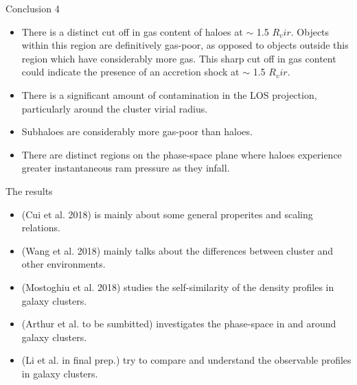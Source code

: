 \documentclass[aspectratio=43]{beamer}
\begin{document}
\begin{frame}{Conclusion 4}
  \begin{itemize}
    \item There is a distinct cut off in gas content of haloes at $\sim$ 1.5 $R_vir$. Objects within this region are definitively gas-poor, as opposed to objects outside this region which have considerably more gas. This sharp cut off in gas content could indicate the presence of an accretion shock at $\sim$ 1.5 $R_vir$.
    \item There is a significant amount of contamination in the LOS projection, particularly around the cluster virial radius.
    \item Subhaloes are considerably more gas-poor than haloes.
    \item There are distinct regions on the phase-space plane where haloes experience greater instantaneous ram pressure as they infall.
  \end{itemize}
    \begin{center}
    \hyperlink{lastpage}{}    
  \end{center}
\end{frame}

\begin{frame}
  \begin{center}
    {\Huge The results} \\
    \bigskip
  \end{center}

  \begin{itemize}
      \item     \hyperlink{intropaper}{} (Cui et al. 2018) is mainly about some general properites and scaling relations.
      \item \hyperlink{Wang}{} (Wang et al. 2018)  mainly talks about the differences between cluster and other environments.
      \item \hyperlink{Mostoghiu}{} (Mostoghiu et al. 2018) studies the self-similarity of the density profiles in galaxy clusters.
      \item \hyperlink{Arthur}{} (Arthur et al. to be sumbitted) investigates the phase-space in and around galaxy clusters.
      \item \hyperlink{Li}{} (Li et al. in final prep.) try to compare and understand the observable profiles in galaxy clusters.
  \end{itemize}
\end{frame}
\end{document}
